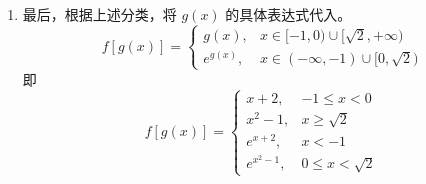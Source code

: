 \begin{solution}
\begin{enumerate}
\begin{itemize}
                        综上，当 $0 \le x < \sqrt{2}$ 或 $x < -1$ 时，$f[g(x)]=e^{g(x)}$。
              \end{itemize}

        \item 最后，根据上述分类，将 $g(x)$ 的具体表达式代入。
              $$ f[g(x)] = \begin{cases}
                      g(x),     & x \in [-1, 0) \cup [\sqrt{2}, +\infty) \\
                      e^{g(x)}, & x \in (-\infty, -1) \cup [0, \sqrt{2})
                  \end{cases} $$
              即
              $$ f[g(x)] = \begin{cases}
                      x+2,       & -1 \le x < 0       \\
                      x^2-1,     & x \ge \sqrt{2}     \\
                      e^{x+2},   & x < -1             \\
                      e^{x^2-1}, & 0 \le x < \sqrt{2}
                  \end{cases} $$
    \end{enumerate}
\end{solution}

